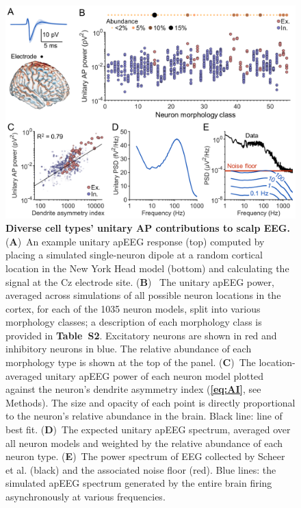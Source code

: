 \begin{figure}[t!]
    \centering
    \includegraphics[width=13.2cm]{Figures/chapter3/figure3.png}
    \caption{\textbf{Diverse cell types' unitary AP contributions to scalp EEG.} (\textbf{A})~An example unitary apEEG response (top) computed by placing a simulated single-neuron dipole at a random cortical location in the New York Head model (bottom) and calculating the signal at the Cz electrode site. (\textbf{B})~ The unitary apEEG power, averaged across simulations of all possible neuron locations in the cortex, for each of the 1035 neuron models, split into various morphology classes; a description of each morphology class is provided in \textbf{Table~S2}. Excitatory neurons are shown in red and inhibitory neurons in blue. The relative abundance of each morphology type is shown at the top of the panel.  (\textbf{C})~The location-averaged unitary apEEG power of each neuron model plotted against the neuron's dendrite asymmetry index (\textbf{\ref{eq:AI}}, see Methods). The size and opacity of each point is directly proportional to the neuron's relative abundance in the brain. Black line: line of best fit. (\textbf{D})~The expected unitary apEEG spectrum, averaged over all neuron models and weighted by the relative abundance of each neuron type. (\textbf{E})~The power spectrum of EEG collected by Scheer et al. \cite{Scheer2006} (black) and the associated noise floor (red). Blue lines: the simulated apEEG spectrum generated by the entire brain firing asynchronously at various frequencies.} 
    \label{fig:uAP_spectrum}
\end{figure}

